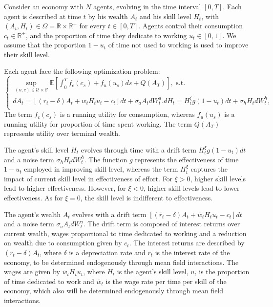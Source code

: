 Consider an economy with $N$ agents, evolving in the time interval $[0,T]$.
Each agent is described at time $t$ by his wealth $A_t$ and his skill level $H_t$,
with $(A_t, H_t) \in \Omega = \mathbb{R} \times \mathbb{R}^+$ for every $t \in [0,T]$.
Agents control their consumption $c_t \in \mathbb{R}^+$, and the proportion of time they dedicate to working $u_t \in [0,1]$. 
We assume that the proportion $1 - u_t$ of time not used to working is used to improve their skill level. 

Each agent face the following optimization problem:
\begin{equation}\label{education_model:representative_agent_optimization}
\begin{cases}
        \sup\limits_{(u,c) \in \mathcal{U} \times \mathcal{C}}\mathbb{E} [ \int_0^T f_c(c_s) + f_u(u_s) ds + Q(A_T) ], \text{ s.t.}\\
        d A_t = \left[ (\bar r_t - \delta) A_t + \bar w_t H_t u_t - c_t  \right] dt + \sigma_a A_t d W^a_t.
        d H_t = H^\xi_t g(1 - u_t) dt + \sigma_h H_t d W^h_t,\\
\end{cases}
\end{equation}
The term $f_c(c_s)$ is a running utility for consumption, whereas $f_u(u_s)$ is a running utility for proportion of time spent working.
The term $Q(A_T)$ represents utility over terminal wealth.

The agent's skill level $H_t$ evolves through time with a drift term $H^\xi_t g(1 - u_t) dt$ and a noise term $\sigma_h H_t dW^h_t$.
The function $g$ represents the effectiveness of time $1 - u_t$ employed in improving skill level,
 whereas the term $H_t^\xi$ captures the impact of current skill level in effectiveness of effort.
 For $\xi > 0$, higher skill levels lead to higher effectiveness.
  However, for $\xi < 0$, higher skill levels lead to lower effectiveness.
  As for $\xi = 0$, the skill level is indifferent to effectiveness.

The agent's wealth $A_t$ evolves with a drift term $\left[ (\bar r_t - \delta) A_t + \bar w_t H_t u_t - c_t  \right] dt $ and a noise term $\sigma_a A_t d W^a_t$.
The drift term is composed of interest returns over current wealth, wages proportional to time dedicated to working and a reduction on wealth due to consumption given by $c_t$.
The interest returns are described by $(\bar r_t - \delta) A_t$, where $\delta$ is a depreciation rate and $\bar r_t$ is the interest rate of the economy, to be determined endogenously through mean field interactions.
The wages are given by $\bar w_t H_t u_t$, where $H_t$ is the agent's skill level, $u_t$ is the proportion of time dedicated to work and $\bar w_t$ is the wage rate per time per skill of the economy, which also will be determined endogenously through mean field interactions.

